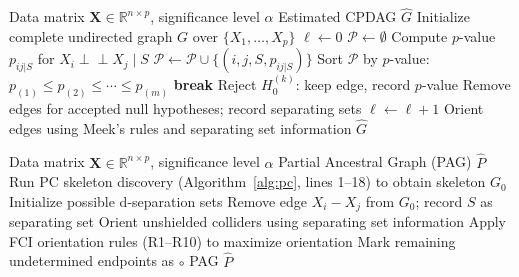 \documentclass[11pt]{article}
\begin{document}
\begin{algorithm}[h]
\caption{PC Algorithm with Holm--Bonferroni Correction}
\label{alg:pc}
\begin{algorithmic}[1]
\Require Data matrix $\mathbf{X} \in \mathbb{R}^{n \times p}$, significance level $\alpha$
\Ensure Estimated CPDAG $\hat{G}$
\State Initialize complete undirected graph $G$ over $\{X_1, \ldots, X_p\}$
\State $\ell \gets 0$ 
  \State $\mathcal{P} \gets \emptyset$ 
      \State Compute $p$-value $p_{ij|S}$ for $X_i \perp\!\!\!\perp X_j \mid S$
      \State $\mathcal{P} \gets \mathcal{P} \cup \{(i,j,S, p_{ij|S})\}$
    \EndFor
  \EndFor
  \State Sort $\mathcal{P}$ by $p$-value: $p_{(1)} \leq p_{(2)} \leq \cdots \leq p_{(m)}$
   
      \State \textbf{break} 
    \EndIf
    \State Reject $H_0^{(k)}$: keep edge, record $p$-value
  \EndFor
  \State Remove edges for accepted null hypotheses; record separating sets
  \State $\ell \gets \ell + 1$
\EndWhile
\State Orient edges using Meek's rules and separating set information
\State \Return $\hat{G}$
\end{algorithmic}
\end{algorithm}

\begin{algorithm}[h]
\caption{FCI Algorithm for Latent Confounders}
\label{alg:fci}
\begin{algorithmic}[1]
\Require Data matrix $\mathbf{X} \in \mathbb{R}^{n \times p}$, significance level $\alpha$
\Ensure Partial Ancestral Graph (PAG) $\hat{P}$
\State Run PC skeleton discovery (Algorithm~\ref{alg:pc}, lines 1--18) to obtain skeleton $G_0$
\State Initialize possible d-separation sets
      \State Remove edge $X_i - X_j$ from $G_0$; record $S$ as separating set
    \EndIf
  \EndFor
\EndFor
\State Orient unshielded colliders using separating set information
\State Apply FCI orientation rules (R1--R10) to maximize orientation
\State Mark remaining undetermined endpoints as $\circ$
\State \Return PAG $\hat{P}$
\end{algorithmic}
\end{algorithm}
\end{document}
